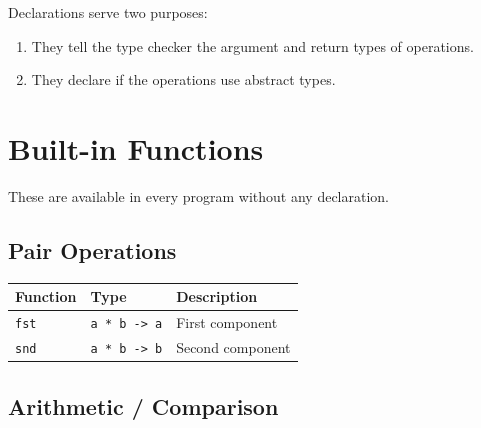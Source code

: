 \documentclass[11pt,a4paper]{article}
\begin{document}
Declarations serve two purposes:

\begin{enumerate}
  \item They tell the type checker the argument and return types of operations.
  \item They declare if the operations use abstract types.
\end{enumerate}

\section{Built-in Functions}
\label{sec:builtinfns}

These are available in every program without any declaration.

\subsection{Pair Operations}

\begin{center}
\begin{tabular}{lll}
\toprule
\textbf{Function} & \textbf{Type} & \textbf{Description} \\
\midrule
\texttt{fst} & \texttt{a * b -> a} & First component \\
\texttt{snd} & \texttt{a * b -> b} & Second component \\
\bottomrule
\end{tabular}
\end{center}

\subsection{Arithmetic / Comparison}
\end{document}

